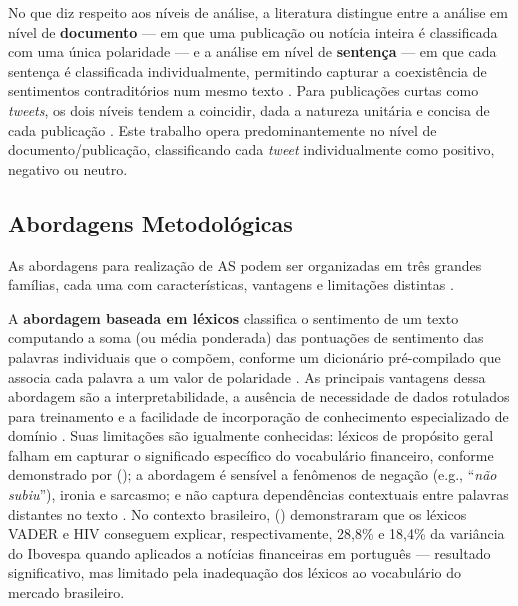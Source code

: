 No que diz respeito aos níveis de análise, a literatura distingue entre a análise em nível de \textbf{documento} --- em que uma publicação ou notícia inteira é classificada com uma única polaridade --- e a análise em nível de \textbf{sentença} --- em que cada sentença é classificada individualmente, permitindo capturar a coexistência de sentimentos contraditórios num mesmo texto \cite{kearney2014}. Para publicações curtas como \textit{tweets}, os dois níveis tendem a coincidir, dada a natureza unitária e concisa de cada publicação \cite{bollen2011,ranco2015}. Este trabalho opera predominantemente no nível de documento/publicação, classificando cada \textit{tweet} individualmente como positivo, negativo ou neutro.


\subsection{Abordagens Metodológicas}
\label{subsec:as_abordagens}

As abordagens para realização de AS podem ser organizadas em três grandes famílias, cada uma com características, vantagens e limitações distintas \cite{kearney2014,liu2020survey,lucas2025}.

A \textbf{abordagem baseada em léxicos} classifica o sentimento de um texto computando a soma (ou média ponderada) das pontuações de sentimento das palavras individuais que o compõem, conforme um dicionário pré-compilado que associa cada palavra a um valor de polaridade \cite{loughran2011,sousa2025}. As principais vantagens dessa abordagem são a interpretabilidade, a ausência de necessidade de dados rotulados para treinamento e a facilidade de incorporação de conhecimento especializado de domínio \cite{lucas2025}. Suas limitações são igualmente conhecidas: léxicos de propósito geral falham em capturar o significado específico do vocabulário financeiro, conforme demonstrado por \citeauthor{loughran2011} (\citeyear{loughran2011}); a abordagem é sensível a fenômenos de negação (e.g., ``\textit{não subiu}''), ironia e sarcasmo; e não captura dependências contextuais entre palavras distantes no texto \cite{liu2020survey}. No contexto brasileiro, \citeauthor{lucas2025} (\citeyear{lucas2025}) demonstraram que os léxicos VADER e HIV conseguem explicar, respectivamente, 28,8\% e 18,4\% da variância do Ibovespa quando aplicados a notícias financeiras em português --- resultado significativo, mas limitado pela inadequação dos léxicos ao vocabulário do mercado brasileiro.

